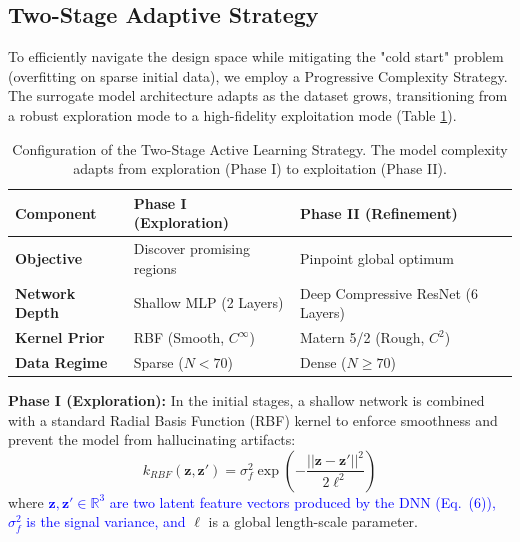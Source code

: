 \documentclass[
  preprint,
  12pt,
  a4paper
]{elsarticle}
\newcommand{\new}[1]{\textcolor{blue}{#1}}
\begin{document}
\subsection{Two-Stage Adaptive Strategy}
\label{sec:two_stage}
To efficiently navigate the design space while mitigating the "cold start" problem (overfitting on sparse initial data), we employ a Progressive Complexity Strategy. The surrogate model architecture adapts as the dataset grows, transitioning from a robust exploration mode to a high-fidelity exploitation mode (Table \ref{tab:phases}).

\begin{table}[htbp]
    \centering
    \caption{Configuration of the Two-Stage Active Learning Strategy. The model complexity adapts from exploration (Phase I) to exploitation (Phase II).}
    \label{tab:phases}
    \begin{tabular}{l l l}
        \toprule
        \textbf{Component} & \textbf{Phase I (Exploration)} & \textbf{Phase II (Refinement)} \\
        \midrule
        \textbf{Objective} & Discover promising regions & Pinpoint global optimum \\
        \textbf{Network Depth} & Shallow MLP (2 Layers) & Deep Compressive ResNet (6 Layers) \\
        \textbf{Kernel Prior} & RBF (Smooth, $C^\infty$) & Matern 5/2 (Rough, $C^2$) \\
        \textbf{Data Regime} & Sparse ($N < 70$) & Dense ($N \geq 70$) \\
        \bottomrule
    \end{tabular}
\end{table}

\textbf{Phase I (Exploration):} In the initial stages, a shallow network is combined with a standard Radial Basis Function (RBF) kernel to enforce smoothness and prevent the model from hallucinating artifacts:
\begin{equation}
    k_{RBF}(\mathbf{z}, \mathbf{z}') = \sigma_f^2 \exp\left( - \frac{||\mathbf{z} - \mathbf{z}'||^2}{2\ell^2} \right)
\end{equation}
where \new{$\mathbf{z}, \mathbf{z}' \in \mathbb{R}^3$ are two latent feature vectors produced by the DNN (Eq.~(6)), $\sigma_f^2$ is the signal variance, and} $\ell$ is a global length-scale parameter.
\end{document}
